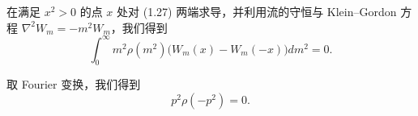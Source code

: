 在满足 $x^2>0$ 的点 $x$ 处对 (1.27) 两端求导，并利用流的守恒与 Klein–Gordon 方程 $\nabla^2W_m=-m^2W_m$，我们得到
\begin{equation}
  \tag{1.28}
  \label{eq:1-28}
  \int_0^\infty m^2\rho(m^2)\bigl(W_m(x)-W_m(-x)\bigr)dm^2=0.
\end{equation}

取 Fourier 变换，我们得到
\begin{equation}
  \tag{1.29}
  \label{eq:1-29}
  p^2\rho(-p^2)=0.
\end{equation}

